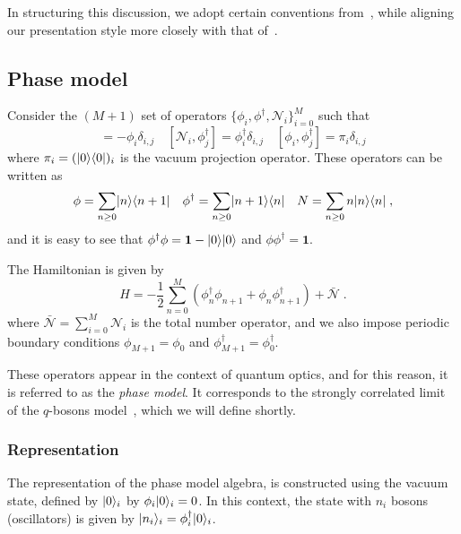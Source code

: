 \documentclass[a4paper,11pt]{amsart}
\begin{document}
In structuring this discussion, we adopt certain conventions
from~\cite{Wheeler:2010vmq}, while aligning our presentation style
more closely with that of~\cite{Tsilevich:2006}.




\subsection{Phase model}
Consider the \((M+1)\) set of operators \(\{\phi_i,
\phi^\dagger,\mathcal{N}_i\}_{i=0}^M\) such that
\begin{equation}
 [\mathcal{N}_i, \phi_j] = - \phi_i \delta_{i,j} \quad
 [\mathcal{N}_i, \phi_j^\dagger] =  \phi_i^\dagger \delta_{i,j}  \quad 
 [\phi_i, \phi_j^\dagger] =  \pi_i \delta_{i,j}  
\end{equation}
where \(\pi_i =(\lvert0\rangle \langle0\rvert)_i\) is the vacuum projection operator.
These operators can be written as
\begin{equation}
\phi = \sum_{n\geq 0}\lvert n\rangle\langle n+1\rvert\quad 
\phi^\dagger = \sum_{n\geq 0}\lvert n+1\rangle\langle n\rvert \quad 
N = \sum_{n\geq 0}n\lvert n\rangle\langle n\rvert\; ,
\end{equation}
and it is easy to see that \(\phi^\dagger \phi = \bm{1} - \lvert0\rangle
\lvert0\rangle\) and \(\phi\phi^\dagger = \bm{1}\).

The Hamiltonian is given by
\begin{equation}
  H = - \frac{1}{2} \sum_{n =0}^M \left(\phi_n^\dagger \phi_{n+1}
  + \phi_n \phi_{n+1}^\dagger \right) + \bar{\mathcal{N}}\; .
\end{equation}
where \(\bar{\mathcal{N}} = \sum_{i=0}^M \mathcal{N}_i\) is the total
number operator, and we also impose periodic boundary conditions
\(\phi_{M+1} = \phi_0\) and \(\phi_{M+1}^\dagger = \phi_0^\dagger\).

These operators appear in the context of quantum optics, and for this
reason, it is referred to as the \emph{phase model}. It corresponds to
the strongly correlated limit of the \(q\)-bosons
model~\cite{Bogoliubov:1997soj}, which we will define shortly.


\subsubsection{Representation}
The representation of the phase model algebra, is constructed using
the vacuum state, defined by \(\lvert0\rangle_i\) by \(\phi_i\lvert0\rangle_i =
0\). In this context, the state with \(n_i\) bosons (oscillators) is
given by \(\lvert n_i\rangle_i = \phi_i^\dagger \lvert0\rangle_i\).
\end{document}
